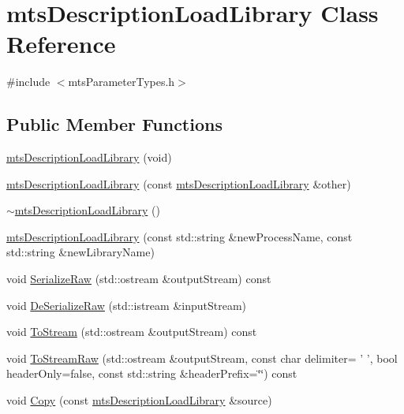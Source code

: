 \hypertarget{classmts_description_load_library}{\section{mts\-Description\-Load\-Library Class Reference}
\label{classmts_description_load_library}
}


{\ttfamily \#include $<$mts\-Parameter\-Types.\-h$>$}

\subsection*{Public Member Functions}
\begin{DoxyCompactItemize}
\item 
\hyperlink{classmts_description_load_library_aca97c3b2da96cf06cd8bdbada628ad53}{mts\-Description\-Load\-Library} (void)
\item 
\hyperlink{classmts_description_load_library_a14d7be4c7342633a4f0f0d889a6fe5f3}{mts\-Description\-Load\-Library} (const \hyperlink{classmts_description_load_library}{mts\-Description\-Load\-Library} \&other)
\item 
\hyperlink{classmts_description_load_library_a2ca70745f7f55957d9d5c74dbc74b0ab}{$\sim$mts\-Description\-Load\-Library} ()
\item 
\hyperlink{classmts_description_load_library_a6ee5c15f87a4c771ceb4c691f8372bf3}{mts\-Description\-Load\-Library} (const std\-::string \&new\-Process\-Name, const std\-::string \&new\-Library\-Name)
\item 
void \hyperlink{classmts_description_load_library_a25fd1b50c1b399087e79a8f7a7497068}{Serialize\-Raw} (std\-::ostream \&output\-Stream) const 
\item 
void \hyperlink{classmts_description_load_library_a800236e5a4c104de355009f7f90b7142}{De\-Serialize\-Raw} (std\-::istream \&input\-Stream)
\item 
void \hyperlink{classmts_description_load_library_affea134de125abe17ca455d20140875d}{To\-Stream} (std\-::ostream \&output\-Stream) const 
\item 
void \hyperlink{classmts_description_load_library_af52d1a80c676782b1132f6fabb3d8e1a}{To\-Stream\-Raw} (std\-::ostream \&output\-Stream, const char delimiter= ' ', bool header\-Only=false, const std\-::string \&header\-Prefix=\char`\"{}\char`\"{}) const 
\item 
void \hyperlink{classmts_description_load_library_a6f59d73e56b0e224aa5aa462a0ed2534}{Copy} (const \hyperlink{classmts_description_load_library}{mts\-Description\-Load\-Library} \&source)

\end{DoxyCompactItemize}
